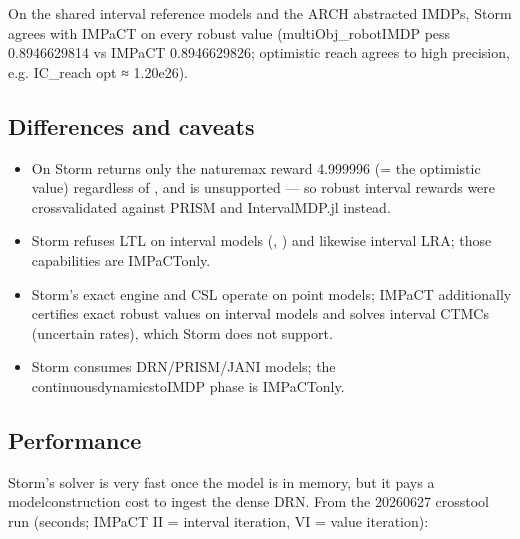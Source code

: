 \documentclass[a4paper,10pt,english]{sphinxmanual}
\begin{document}
\sphinxAtStartPar
On the shared interval reference models and the ARCH abstracted IMDPs, Storm agrees with
IMPaCT on every robust value (multiObj\_robotIMDP pess 0.8946629814 vs IMPaCT
0.8946629826; optimistic reach agrees to high precision, e.g. IC\_reach opt ≈ 1.20e\sphinxhyphen{}26).


\subsection{Differences and caveats}
\label{\detokenize{comparison/impact-vs-storm:differences-and-caveats}}\begin{itemize}
\item {} 
\sphinxAtStartPar
{} On  Storm returns only
the nature\sphinxhyphen{}max reward 4.999996 (= the optimistic value) regardless of
, and  is unsupported — so robust interval rewards
were cross\sphinxhyphen{}validated against PRISM and IntervalMDP.jl instead.

\item {} 
\sphinxAtStartPar
{} Storm refuses LTL on interval models
(,
) and likewise interval LRA; those capabilities
are IMPaCT\sphinxhyphen{}only.

\item {} 
\sphinxAtStartPar
{} Storm’s exact engine and CSL operate on point models;
IMPaCT additionally certifies exact robust values on interval models and solves
interval CTMCs (uncertain rates), which Storm does not support.

\item {} 
\sphinxAtStartPar
{} Storm consumes DRN/PRISM/JANI models; the
continuous\sphinxhyphen{}dynamics\sphinxhyphen{}to\sphinxhyphen{}IMDP phase is IMPaCT\sphinxhyphen{}only.

\end{itemize}


\subsection{Performance}
\label{\detokenize{comparison/impact-vs-storm:performance}}
\sphinxAtStartPar
Storm’s solver is very fast once the model is in memory, but it pays a
model\sphinxhyphen{}construction cost to ingest the dense DRN. From the 2026\sphinxhyphen{}06\sphinxhyphen{}27 cross\sphinxhyphen{}tool run
(seconds; IMPaCT II = interval iteration, VI = value iteration):
\end{document}
